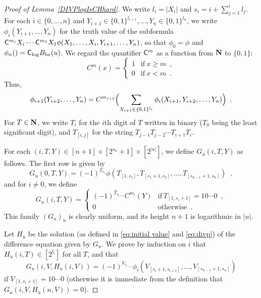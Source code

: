 \begin{proof}[Proof of Lemma~\ref{DIVPlogIsCHhard}]
We write $l_i = |X_i|$ and $s_i = i + \sum^i_{j=1}l_j$.
For each $i \in \{0, \dots, n\}$ and
$Y_{i+1} \in \{0,1\}^{l_{i+1}}, \dots, Y_n \in \{0,1\}^{l_n}$,
we write $\phi_i(Y_{i+1}, \dots, Y_n)$ for the truth value of the subformula
$\mathsf{C}^{m_{i}}{X_i} \cdots \mathsf{C}^{m_1}{X_1} \phi(X_1, \dots, X_i, Y_{i+1}, \dots, Y_n)$,
so that $\phi_0 = \phi$ and $\phi_n() = \mathsf{C}_{\log} B_{\mathrm{be}} (u)$.
We regard the quantifier $\mathsf{C}^m$ as a function from $\mathbf N$ to $\{0,1\}$:
\begin{equation}
 C^m(x) 
  = \begin{cases}
     1 & \text{if} \ x \ge m \enspace , \\
     0 & \text{if} \ x < m \enspace .
    \end{cases}
\end{equation}
Thus,
\begin{equation}
\label{eq:phi-step}
   \phi_{i+1}(Y_{i+2}, \dots, Y_n) 
  = 
   C^{m_{i+1}} \Bigl( 
     \sum_{X_{i+1} \in \{ 0,1 \} ^{l_i}}
		\phi_i(X_{i+1}, Y_{i+2}, \dots, Y_{n})
   \Bigr) \enspace .
\end{equation}
For $T \in \mathbf N$, we write $T_i$ for the 
$i$th digit of $T$ written in binary 
($T _0$ being the least significant digit),
and $T_{[i,j]}$ for the string $T_{j-1} T_{j-2} \cdots T_{i+1} T_{i}$.

For each $(i, T, Y) \in [n+1] \times [2^{s_n}+1] \times [2^{|u|}]$,
we define $G_u (i, T, Y)$ as follows.
The first row is given by
\begin{equation}
\label{eq:def-Gu:case0}
  G_u(0,T,Y) = 
   (-1)^{T_{s_1}}\phi(T_{[1,s_1]}, T_{[s_1+1,s_2]},
    \dots, T_{[s_{n-1}+1,s_n]}) \enspace , 
\end{equation}
and for $i \neq 0$, we define 
\begin{equation} 
  G_u(i,T,Y) = 
   \begin{cases}
    (-1)^{T_{s_{i+1}}} C^{m_i}(Y) 
    & \text{if} \ T_{[1,s_i+1]} = 10 \cdots 0  \enspace , \\
    0 & \text{otherwise}  \enspace .
   \end{cases} 
   \label{eq:def-Gu:case-nonzero}
 \end{equation}
This family $(G_u)_u$ is clearly uniform, 
and its height $n + 1$ is logarithmic in $|u|$.

Let $H_u$ be the solution (as defined in 
\eqref{eq:initial value} and \eqref{eq:divp}) 
of the difference equation given by $G_u$. 
We prove by induction on $i$ 
that $H_u(i, T) \in [2^{l_i}]$ for all $T$, and that 
\begin{equation} \label{eq:subformula}
  G_u(i,V,H_u(i,V)) = (-1)^{V_{s_{i+1}}} 
   \phi_i(V_{[s_i+1, s_{i+1}]}, \dots, V_{[s_{n-1}+1, s_n]})
\end{equation}
if $V_{[1, s_i +1]} = 10 \cdots 0$
(otherwise it is immediate from the definition that $G_u(i, V, H_u(n, V)) = 0$).


\end{proof}
